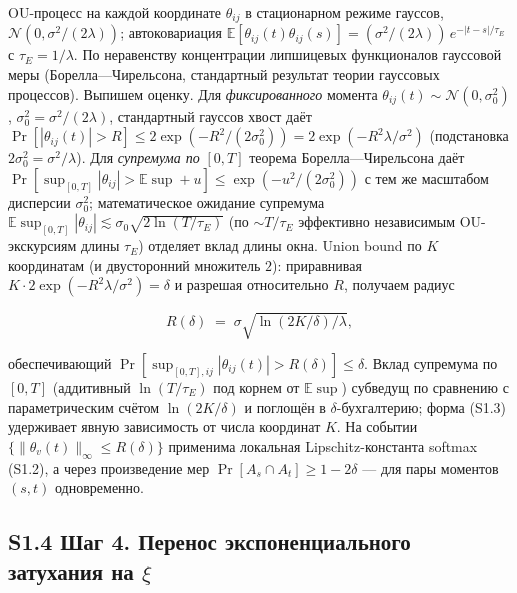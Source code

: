 \documentclass[pdflatex,sn-mathphys-ay]{sn-jnl}
\begin{document}
OU-процесс на каждой координате \(\theta_{ij}\) в стационарном режиме гауссов, \(\mathcal{N}(0, \sigma^2/(2\lambda))\); автоковариация \(\mathbb{E}[\theta_{ij}(t)\theta_{ij}(s)] = (\sigma^2/(2\lambda))\, e^{-|t-s|/\tau_E}\) с \(\tau_E = 1/\lambda\). По неравенству концентрации липшицевых функционалов гауссовой меры (Борелла---Чирельсона, стандартный результат теории гауссовых процессов). Выпишем оценку. Для \emph{фиксированного} момента \(\theta_{ij}(t) \sim \mathcal{N}(0, \sigma_0^2)\), \(\sigma_0^2 = \sigma^2/(2\lambda)\), стандартный гауссов хвост даёт \(\Pr[|\theta_{ij}(t)| > R] \le 2\exp(-R^2/(2\sigma_0^2)) = 2\exp(-R^2\lambda/\sigma^2)\) (подстановка \(2\sigma_0^2 = \sigma^2/\lambda\)). Для \emph{супремума по} \([0,T]\) теорема Борелла---Чирельсона даёт \(\Pr[\sup_{[0,T]}|\theta_{ij}| > \mathbb{E}\sup + u] \le \exp(-u^2/(2\sigma_0^2))\) с тем же масштабом дисперсии \(\sigma_0^2\); математическое ожидание супремума \(\mathbb{E}\sup_{[0,T]}|\theta_{ij}| \lesssim \sigma_0\sqrt{2\ln(T/\tau_E)}\) (по \(\sim T/\tau_E\) эффективно независимым OU-экскурсиям длины \(\tau_E\)) отделяет вклад длины окна. Union bound по \(K\) координатам (и двусторонний множитель \(2\)): приравнивая \(K \cdot 2\exp(-R^2\lambda/\sigma^2) = \delta\) и разрешая относительно \(R\), получаем радиус



\begin{equation}R(\delta) \;=\; \sigma \sqrt{\ln(2K/\delta)/\lambda}, \tag{S1.3}\end{equation}



обеспечивающий \(\Pr[\sup_{[0,T], ij} |\theta_{ij}(t)| > R(\delta)] \le \delta\). Вклад супремума по \([0,T]\) (аддитивный \(\ln(T/\tau_E)\) под корнем от \(\mathbb{E}\sup\)) субведущ по сравнению с параметрическим счётом \(\ln(2K/\delta)\) и поглощён в \(\delta\)-бухгалтерию; форма (S1.3) удерживает явную зависимость от числа координат \(K\). На событии \(\{\|\theta_v(t)\|_\infty \le R(\delta)\}\) применима локальная Lipschitz-константа softmax (S1.2), а через произведение мер \(\Pr[A_s \cap A_t] \ge 1 - 2\delta\) --- для пары моментов \((s, t)\) одновременно.



\subsection*{\texorpdfstring{S1.4 Шаг 4. Перенос экспоненциального затухания на \(\xi\)}{S1.4 Шаг 4. Перенос экспоненциального затухания на \textbackslash xi}}\label{s1.4-ux448ux430ux433-4.-ux43fux435ux440ux435ux43dux43eux441-ux44dux43aux441ux43fux43eux43dux435ux43dux446ux438ux430ux43bux44cux43dux43eux433ux43e-ux437ux430ux442ux443ux445ux430ux43dux438ux44f-ux43dux430-xi}
\end{document}
